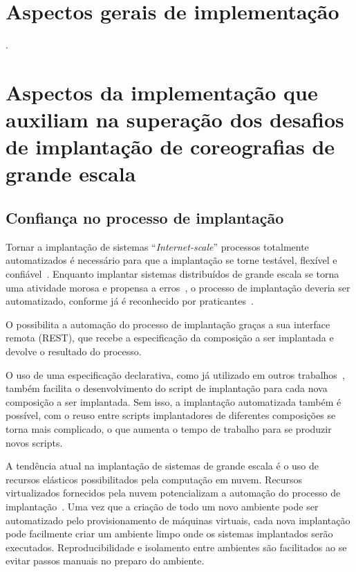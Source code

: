 \section{Aspectos gerais de implementação}

.

\section{Aspectos da implementação que auxiliam na superação dos desafios de implantação de coreografias de grande escala}

\subsection{Confiança no processo de implantação}
\label{subsec:process}

Tornar a implantação de sistemas ``\emph{Internet-scale}'' processos totalmente automatizados
é necessário para que a implantação se torne testável, flexível e confiável~\cite{Hamilton2007InternetScale}.
Enquanto implantar sistemas distribuídos de grande escala se torna uma atividade
morosa e propensa a erros~\cite{Dolstra2005Configuration},
o processo de implantação deveria ser automatizado,
conforme já é reconhecido por praticantes~\cite{Humble2011Continuous}.

O \ee possibilita a automação do processo de implantação
graças a sua interface remota (REST), que recebe a especificação
da composição a ser implantada e devolve o resultado do processo.

O uso de uma especificação declarativa,
como já utilizado em outros trabalhos~\cite{Balter1998Olan,Magee1996Dynamic},
também facilita o desenvolvimento do script de implantação
para cada nova composição a ser implantada.
Sem isso, a implantação automatizada também é possível,
com o reuso entre scripts implantadores de diferentes composições
se torna mais complicado, o que aumenta o tempo de trabalho
para se produzir novos scripts.

A tendência atual na implantação de sistemas de grande escala é o uso
de recursos elásticos possibilitados pela computação em nuvem.
Recursos virtualizados fornecidos pela nuvem potencializam
a automação do processo de implantação~\cite{Humble2011Continuous}.
Uma vez que a criação de todo um novo ambiente pode ser automatizado
pelo provisionamento de máquinas virtuais, cada nova implantação
pode facilmente criar um ambiente limpo onde os sistemas implantados
serão executados.
Reproducibilidade e isolamento entre ambientes são facilitados
ao se evitar passos manuais no preparo do ambiente.

